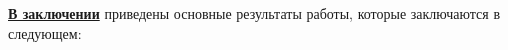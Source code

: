 
\FloatBarrier
{}                                  %
\underline{\textbf{В заключении}} приведены основные результаты работы, которые заключаются в следующем:



